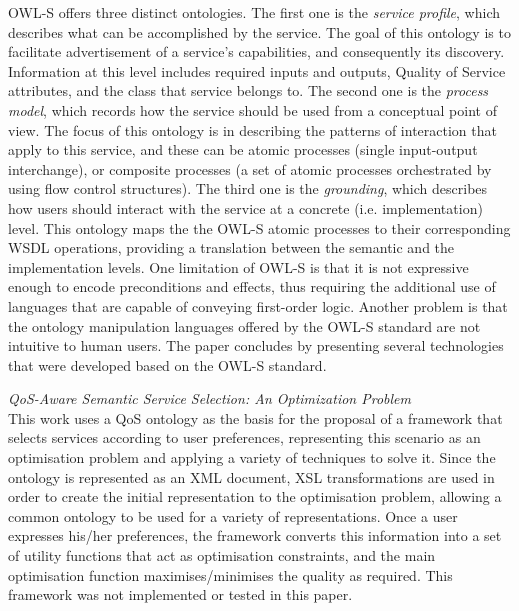 OWL-S offers three distinct ontologies. The first one is the \textit{service profile}, which describes what
can be accomplished by the service. The goal of this ontology is to facilitate advertisement of a service's
capabilities, and consequently its discovery. Information at this level includes required inputs and outputs,
Quality of Service attributes, and the class that service belongs to. The second one is the
\textit{process model}, which records how the service should be used from a conceptual point of view.
The focus of this ontology is in describing the patterns of interaction that apply to this service, and these
can be atomic processes (single input-output interchange), or composite processes (a set of atomic processes
orchestrated by using flow control structures). The third one is the \textit{grounding}, which describes how
users should interact with the service at a concrete (i.e. implementation) level. This ontology maps the
the OWL-S atomic processes to their corresponding WSDL operations, providing a translation between the
semantic and the implementation levels. One limitation of OWL-S is that it is not expressive enough to encode
preconditions and effects, thus requiring the additional use of languages that are capable of conveying
first-order logic. Another problem is that the ontology manipulation languages offered by the OWL-S standard
are not intuitive to human users. The paper concludes by presenting several technologies that were developed
based on the OWL-S standard.


\textit{QoS-Aware Semantic Service Selection: An Optimization Problem \cite{garcia2008qos}}\\
This work uses a QoS ontology as the basis for the proposal of a framework that selects services according to user preferences, representing this scenario as an optimisation problem and applying a variety of techniques to solve it. Since the ontology is represented as an XML document, XSL transformations are used in order to create the initial representation to the optimisation problem, allowing a common ontology to be used for a variety of representations. Once a user expresses his/her preferences, the framework converts this information into a set of utility functions that act as optimisation constraints, and the main optimisation function maximises/minimises the quality as required. This framework was not implemented or tested in this paper.

